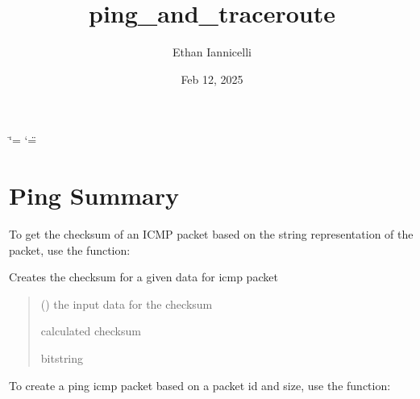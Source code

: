 \documentclass[letterpaper,10pt,english,openany,oneside]{sphinxmanual}
\title{ping\_and\_traceroute}
\date{Feb 12, 2025}
\author{Ethan Iannicelli}
\begin{document}
\ifdefined\shorthandoff
  \ifnum\catcode`\=\string=\active\shorthandoff{=}\fi
  \ifnum\catcode`\"=\active{}\fi
\fi

\pagestyle{empty}
\sphinxmaketitle
\pagestyle{plain}
\sphinxtableofcontents
\pagestyle{normal}
\label{\detokenize{index::doc}}



\chapter{Ping Summary}
\label{\detokenize{index:ping-summary}}
\sphinxAtStartPar
To get the checksum of an ICMP packet based on the
string representation of the packet, use the  function:

\begin{fulllineitems}
\label{\detokenize{index:my_ping.checksum}}
\pysigstartsignatures
\pysiglinewithargsret
{}
{}
{}
\pysigstopsignatures
\sphinxAtStartPar
Creates the checksum for a given data for icmp packet
\begin{quote}\begin{description}
\sphinxAtStartPar
{} () \textendash{} the input data for the checksum

\sphinxAtStartPar
calculated checksum

\sphinxAtStartPar
bitstring

\end{description}\end{quote}

\end{fulllineitems}


\sphinxAtStartPar
To create a ping icmp packet based on a packet id and size,
use the  function:
\end{document}
